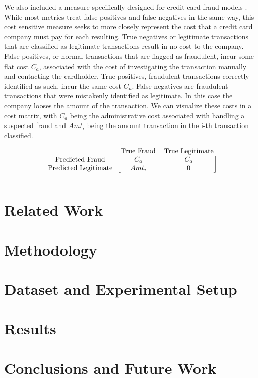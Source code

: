 \documentclass{article}
\begin{document}
We also included a measure specifically designed for credit card fraud models \cite{New_metric}. While most metrics treat false positives and false negatives in the same way, this cost sensitive measure seeks to more closely represent the cost that a credit card company must pay for each resulting. True negatives or legitimate transactions that are classified as legitimate transactions result in no cost to the company. False positives, or normal transactions that are flagged as fraudulent, incur some flat cost $C_a$, associated with the cost of investigating the transaction manually and contacting the cardholder. True positives, fraudulent transactions correctly identified as such, incur the same cost $C_a$. False negatives are fraudulent transactions that were mistakenly identified as legitimate. In this case the company looses the amount of the transaction. We can visualize these costs in a cost matrix, with $C_a$ being the administrative cost associated with handling a suspected fraud and $Amt_i$ being the amount transaction in the i-th transaction classified. 

\[
\begin{blockarray}{ccc}
& \text{True Fraud} & \text{True Legitimate} \\
\begin{block}{c[cc]}
  \text{Predicted Fraud} & C_a & C_a\\
  \text {Predicted Legitimate} & Amt_i & 0 \\
\end{block}
\end{blockarray}
\]

\section{Related Work}

\section{Methodology}

\section{Dataset and Experimental Setup}

\section{Results}

\section{Conclusions and Future Work}




\end{document}
